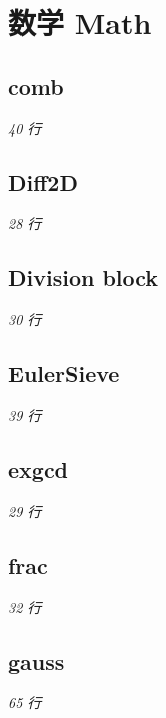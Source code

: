 \documentclass[12pt, UTF8]{ctexart}
\begin{document}


\section{数学 Math}

\subsection{comb}\hfill\normalsize\textit{40 行}



\subsection{Diff2D}\hfill\normalsize\textit{28 行}



\subsection{Division block}\hfill\normalsize\textit{30 行}



\subsection{EulerSieve}\hfill\normalsize\textit{39 行}



\subsection{exgcd}\hfill\normalsize\textit{29 行}



\subsection{frac}\hfill\normalsize\textit{32 行}



\subsection{gauss}\hfill\normalsize\textit{65 行}


\end{document}
